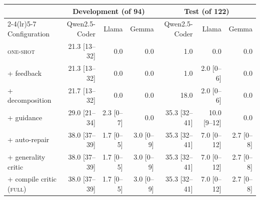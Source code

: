 \begin{tabular}{lrrrrrr}
\toprule
 & \multicolumn{3}{c}{Development (of 94)} & \multicolumn{3}{c}{Test (of 122)} \\
\cmidrule(lr){2-4}\cmidrule(lr){5-7}
Configuration & Qwen2.5-Coder & Llama & Gemma & Qwen2.5-Coder & Llama & Gemma \\
\midrule
\textsc{one-shot} & 21.3 [13--32] & 0.0 & 0.0 & 1.0 & 0.0 & 0.0 \\
+ feedback & 21.3 [13--32] & 0.0 & 0.0 & 1.0 & 2.0 [0--6] & 0.0 \\
+ decomposition & 21.7 [13--32] & 0.0 & 0.0 & 18.0 & 2.0 [0--6] & 0.0 \\
+ guidance & 29.0 [21--34] & 2.3 [0--7] & 0.0 & 35.3 [32--41] & 10.0 [9--12] & 0.0 \\
+ auto-repair & 38.0 [37--39] & 1.7 [0--5] & 3.0 [0--9] & 35.3 [32--41] & 7.0 [0--12] & 2.7 [0--8] \\
+ generality critic & 38.0 [37--39] & 1.7 [0--5] & 3.0 [0--9] & 35.3 [32--41] & 7.0 [0--12] & 2.7 [0--8] \\
+ compile critic (\textsc{full}) & 38.0 [37--39] & 1.7 [0--5] & 3.0 [0--9] & 35.3 [32--41] & 7.0 [0--12] & 2.7 [0--8] \\
\bottomrule
\end{tabular}
